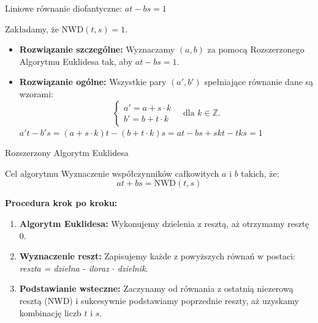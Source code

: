 \documentclass{beamer}
\begin{document}
\begin{frame}{Liniowe równanie diofantyczne: $at - bs = 1$}

    Zakładamy, że \(\text{NWD}(t, s) = 1\).

    \vfill

    \begin{itemize}
        \item \textbf{Rozwiązanie szczególne:} Wyznaczamy $(a, b)$ za pomocą Rozszerzonego Algorytmu Euklidesa tak, aby \( at - bs = 1 \).

        \item \textbf{Rozwiązanie ogólne:} Wszystkie pary $(a', b')$ spełniające równanie dane są wzorami:
              \[
                  \begin{cases}
                      a' = a + s \cdot k \\
                      b' = b + t \cdot k
                  \end{cases} \quad \text{dla } k \in \mathbb{Z}.
              \]
              \(a't-b's = (a+s\cdot k)t - (b+t\cdot k)s = at-bs + skt - tks = 1\)
    \end{itemize}
\end{frame}

\begin{frame}{Rozszerzony Algorytm Euklidesa}
    \begin{block}{Cel algorytmu}
        Wyznaczenie współczynników całkowitych $a$ i $b$ takich, że:
        \[ at + bs = \text{NWD}(t, s) \]
    \end{block}

    \textbf{Procedura krok po kroku:}
    \begin{enumerate}
        \item \textbf{Algorytm Euklidesa:} Wykonujemy dzielenia z resztą, aż otrzymamy resztę $0$.
        \item \textbf{Wyznaczenie reszt:} Zapisujemy każde z powyższych równań w postaci: \textit{reszta = dzielna - iloraz $\cdot$ dzielnik}.
        \item \textbf{Podstawianie wsteczne:} Zaczynamy od równania z ostatnią niezerową resztą (NWD) i sukcesywnie podstawiamy poprzednie reszty, aż uzyskamy kombinację liczb $t$ i $s$.
    \end{enumerate}
\end{frame}
\end{document}
